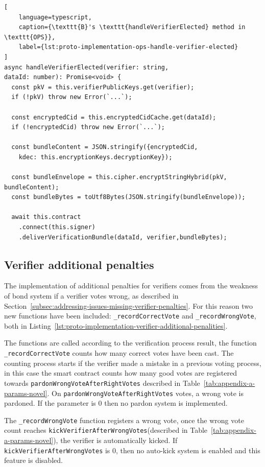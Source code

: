 \begin{lstlisting}[
    language=typescript,
    caption={\texttt{B}'s \texttt{handleVerifierElected} method in \texttt{OPS}},
    label={lst:proto-implementation-ops-handle-verifier-elected}
]
async handleVerifierElected(verifier: string,
dataId: number): Promise<void> {
  const pkV = this.verifierPublicKeys.get(verifier);
  if (!pkV) throw new Error(`...`);

  const encryptedCid = this.encryptedCidCache.get(dataId);
  if (!encryptedCid) throw new Error(`...`);

  const bundleContent = JSON.stringify({encryptedCid,
    kdec: this.encryptionKeys.decryptionKey});

  const bundleEnvelope = this.cipher.encryptStringHybrid(pkV, bundleContent);
  const bundleBytes = toUtf8Bytes(JSON.stringify(bundleEnvelope));

  await this.contract
    .connect(this.signer)
    .deliverVerificationBundle(dataId, verifier,bundleBytes);

\end{lstlisting}

\subsection{Verifier additional penalties}\label{subsec:extended-protocol-verifier-additional-penalties}
The implementation of additional penalties for verifiers comes from the weakness of bond system if a verifier votes wrong, as described in Section~\ref{subsec:addressing-issues-missing-verifier-penalties}.
For this reason two new functions have been included: \lstinline{_recordCorrectVote} and \lstinline{_recordWrongVote}, both in Listing~\ref{lst:proto-implementation-verifier-additional-penalities}.

The functions are called according to the verification process result, the function \lstinline{_recordCorrectVote} counts how many correct votes have been cast.
The counting process starts if the verifier made a mistake in a previous voting process, in this case the smart contract counts how many good votes are registered towards \lstinline{pardonWrongVoteAfterRightVotes} described in Table~\ref{tab:appendix-a-params-novel}.
On \lstinline{pardonWrongVoteAfterRightVotes} votes, a wrong vote is pardoned.
If the parameter is $0$ then no pardon system is implemented.

The \lstinline{_recordWrongVote} function registers a wrong vote, once the wrong vote count reaches \lstinline{kickVerifierAfterWrongVotes}(described in Table~\ref{tab:appendix-a-params-novel}), the verifier is automatically kicked.
If \lstinline{kickVerifierAfterWrongVotes} is $0$, then no auto-kick system is enabled and this feature is disabled.

